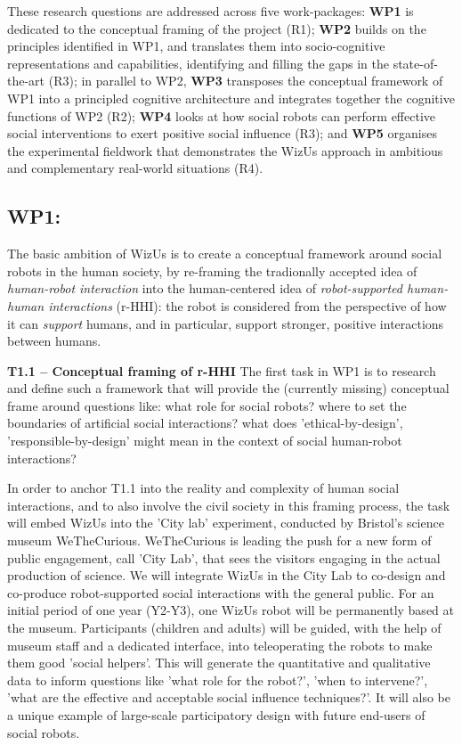 \documentclass[11pt,a4paper]{report}
\newcommand{\project}{WizUs\xspace}
\begin{document}
These research questions are addressed across five work-packages: \textbf{WP1}
is dedicated to the conceptual framing of the project (R1); \textbf{WP2} builds
on the principles identified in WP1, and translates them into socio-cognitive
representations and capabilities, identifying and filling the gaps in the
state-of-the-art (R3); in parallel to WP2, \textbf{WP3} transposes the
conceptual framework of WP1 into a principled cognitive architecture and
integrates together the cognitive functions of WP2 (R2); \textbf{WP4} looks at
how social robots can perform effective social interventions to exert positive
social influence (R3); and \textbf{WP5} organises the experimental fieldwork
that demonstrates the \project approach in ambitious and
complementary real-world situations (R4).

\subsection{WP1: \textbf{\wpOne}}

\noindent{}

The basic ambition of \project is to create a conceptual framework around social
robots in the human society, by re-framing the tradionally accepted idea of
\emph{human-robot interaction} into the human-centered idea of
\emph{robot-supported human-human interactions} (r-HHI): the robot is considered
from the perspective of how it can \emph{support} humans, and in particular,
support stronger, positive interactions between humans.

\textbf{T1.1 -- Conceptual framing of r-HHI} The first task in WP1 is to research and
define such a framework that will provide the (currently missing) conceptual
frame around questions like: what role for social robots? where to set the
boundaries of artificial social interactions? what does 'ethical-by-design',
'responsible-by-design' might mean in the context of social human-robot
interactions? 

In order to anchor T1.1 into the reality and complexity of human social
interactions, and to also involve the civil society in this framing process, the
task will embed \project into the 'City lab' experiment, conducted by Bristol's
science museum WeTheCurious. WeTheCurious is leading the push for a new form of
public engagement, call 'City Lab', that sees the visitors engaging in the
actual production of science. We will integrate \project in the City Lab to
co-design and co-produce robot-supported social interactions with the general
public. For an initial period of one year (Y2-Y3), one \project robot will be
permanently based at the museum.  Participants (children and adults) will be
guided, with the help of museum staff and a dedicated interface, into
teleoperating the robots to make them good 'social helpers'. This will generate
the quantitative and qualitative data to inform questions like 'what role for
the robot?', 'when to intervene?', 'what are the effective and acceptable social
influence techniques?'. It will also be a unique example of large-scale
participatory design with future end-users of social robots.
\end{document}
